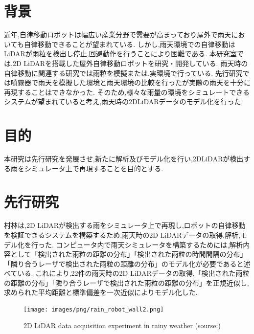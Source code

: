 
\section{背景}
近年,自律移動ロボットは幅広い産業分野で需要が高まっており屋外で雨天においても自律移動できることが望まれている.
しかし,雨天環境での自律移動はLiDARが雨粒を検出し停止,回避動作を行うことにより困難である.
本研究室では,2D LiDARを搭載した屋外自律移動ロボットを研究・開発している.
雨天時の自律移動に関連する研究では雨粒を模擬または,実環境で行っている.
先行研究\cite{mura}では噴霧器で雨天を模擬した環境と雨天環境の比較を行ったが実際の雨天を十分に再現することはできなかった.
そのため,様々な雨量の環境をシミュレートできるシステムが望まれていると考え,雨天時の2DLiDARデータのモデル化を行った.

\section{目的}
本研究は先行研究\cite{mura}を発展させ,新たに解析及びモデル化を行い,2DLiDARが検出する雨をシミュレータ上で再現することを目的とする.

\section{先行研究}
村林\cite{mura}は,2D LiDARが検出する雨をシミュレータ上で再現し,ロボットの自律移動を検証できるシステムを構築するため,雨天時の2D LiDARデータの取得,解析,モデル化を行った.
コンピュータ内で雨天シミュレータを構築するためには,解析内容として「検出された雨粒の距離の分布」「検出された雨粒の時間間隔の分布」「隣り合うレーザで検出された雨粒の距離の分布」のモデル化が必要であると述べている.
これにより,22件の雨天時の2D LiDARデータの取得,「検出された雨粒の距離の分布」「隣り合うレーザで検出された雨粒の距離の分布」を正規近似し,求められた平均距離と標準偏差を一次近似によりモデル化した.

\begin{figure}[h]
  \centering
  \texttt{[image: images/png/rain\_robot\_wall2.png]}
  \caption{2D LiDAR data acquisition experiment in rainy weather (sourse:\cite{mura})}
  \label{Fig:1.1}
\end{figure}

